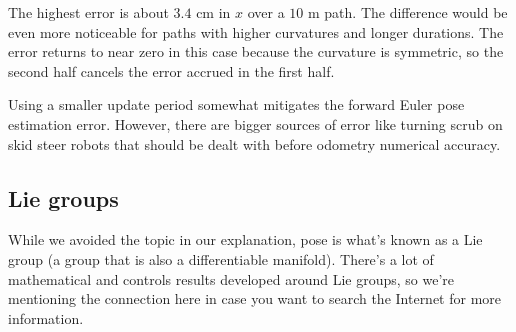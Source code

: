 The highest error is about $3.4$ cm in $x$ over a $10$ m path. The difference
would be even more noticeable for paths with higher curvatures and longer
durations. The error returns to near zero in this case because the curvature is
symmetric, so the second half cancels the error accrued in the first half.

Using a smaller update period somewhat mitigates the forward Euler pose
estimation error. However, there are bigger sources of error like turning scrub
on skid steer robots that should be dealt with before odometry numerical
accuracy.

\subsection{Lie groups}

While we avoided the topic in our explanation, pose is what's known as a Lie
group (a group that is also a differentiable manifold). There's a lot of
mathematical and controls results  developed around Lie groups, so we're
mentioning the connection here in case you want to search the Internet for more
information.
